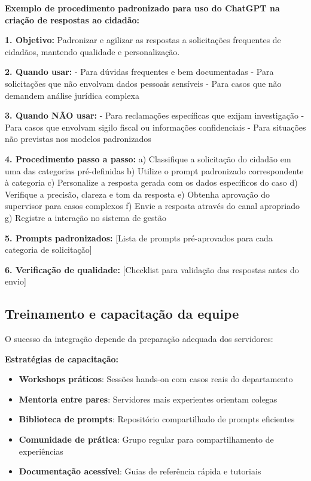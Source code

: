 \documentclass[12pt,a4paper]{book}
\begin{document}
\begin{tcolorbox}[exemplo]
\textbf{Exemplo de procedimento padronizado para uso do ChatGPT na criação de respostas ao cidadão:}

\textbf{1. Objetivo:} Padronizar e agilizar as respostas a solicitações frequentes de cidadãos, mantendo qualidade e personalização.

\textbf{2. Quando usar:}
- Para dúvidas frequentes e bem documentadas
- Para solicitações que não envolvam dados pessoais sensíveis
- Para casos que não demandem análise jurídica complexa

\textbf{3. Quando NÃO usar:}
- Para reclamações específicas que exijam investigação
- Para casos que envolvam sigilo fiscal ou informações confidenciais
- Para situações não previstas nos modelos padronizados

\textbf{4. Procedimento passo a passo:}
a) Classifique a solicitação do cidadão em uma das categorias pré-definidas
b) Utilize o prompt padronizado correspondente à categoria
c) Personalize a resposta gerada com os dados específicos do caso
d) Verifique a precisão, clareza e tom da resposta
e) Obtenha aprovação do supervisor para casos complexos
f) Envie a resposta através do canal apropriado
g) Registre a interação no sistema de gestão

\textbf{5. Prompts padronizados:}
[Lista de prompts pré-aprovados para cada categoria de solicitação]

\textbf{6. Verificação de qualidade:}
[Checklist para validação das respostas antes do envio]
\end{tcolorbox}

\subsection{Treinamento e capacitação da equipe}

O sucesso da integração depende da preparação adequada dos servidores:

\textbf{Estratégias de capacitação:}
\begin{itemize}
    \item \textbf{Workshops práticos}: Sessões hands-on com casos reais do departamento
    \item \textbf{Mentoria entre pares}: Servidores mais experientes orientam colegas
    \item \textbf{Biblioteca de prompts}: Repositório compartilhado de prompts eficientes
    \item \textbf{Comunidade de prática}: Grupo regular para compartilhamento de experiências
    \item \textbf{Documentação acessível}: Guias de referência rápida e tutoriais
\end{itemize}
\end{document}
